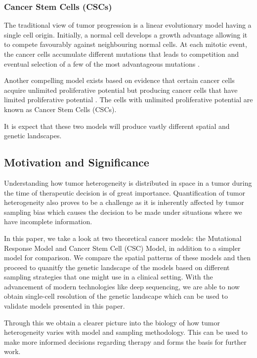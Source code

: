\documentclass[12pt]{article}
\begin{document}
\subsubsection{Cancer Stem Cells (CSCs)}
The traditional view of tumor progression is a linear evolutionary model having a single cell origin. Initially, a normal cell develops a growth advantage allowing it to compete favourably against neighbouring normal cells. At each mitotic event, the cancer cells accumulate different mutations that leads to competition and eventual selection of a few of the most advantageous mutations \cite{Nowell1976}. 

Another compelling model exists based on evidence that certain cancer cells acquire unlimited proliferative potential but producing cancer cells that have limited proliferative potential \cite{Tomasson2009}. The cells with unlimited proliferative potential are known as Cancer Stem Cells (CSCs).

It is expect that these two models will produce vastly different spatial and genetic landscapes.

\subsection{Motivation and Significance}
Understanding how tumor heterogeneity is distributed in space in a tumor during the time of therapeutic decision is of great importance. Quantification of tumor heterogeneity also proves to be a challenge as it is inherently affected by tumor sampling bias \cite{Heppner1983}\cite{Naxerova2015} which causes the decision to be made under situations where we have incomplete information. 

In this paper, we take a look at two theoretical cancer models: the Mutational Response Model and Cancer Stem Cell (CSC) Model, in addition to a simpler model for comparison. We compare the spatial patterns of these models and then proceed to quanitfy the genetic landscape of the models based on different sampling strategies that one might use in a clinical setting. With the advancement of modern technologies like deep sequencing, we are able to now obtain single-cell resolution of the genetic landscape which can be used to validate models presented in this paper. 

Through this we obtain a clearer picture into the biology of how tumor heterogeneity varies with model and sampling methodology. This can be used to make more informed decisions regarding therapy and forms the basis for further work.
\end{document}
